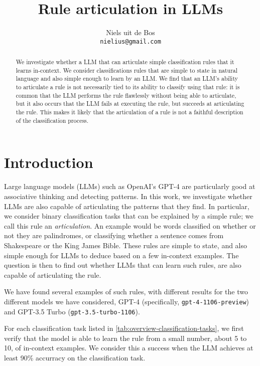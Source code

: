 \documentclass{article}
\title{Rule articulation in LLMs}
\author{%
  Niels uit de Bos \\
  \texttt{nielius@gmail.com} \\
}
\newcommand{\gptf}{GPT-4}
\newcommand{\gptt}{GPT-3.5 Turbo}
\begin{document}
\maketitle


\begin{abstract}
  We investigate whether a LLM that can articulate simple classification rules
  that it learns in-context.
  We consider classifications rules that are simple to state in natural language
  and also simple enough to learn by an LLM.
  We find that an LLM's ability to articulate a rule is not necessarily tied
  to its ability to classify using that rule:
  it is common that the LLM performs the rule flawlessly without being able to articulate,
  but it also occurs that the LLM fails at executing the rule, but succeeds
  at articulating the rule.
  This makes it likely that the articulation of a rule is not a faithful description
  of the classification process.
\end{abstract}


\section{Introduction}

Large language models (LLMs) such as OpenAI's GPT-4 are particularly good at associative thinking
and detecting patterns.
In this work, we investigate whether LLMs are also capable of articulating
the patterns that they find.
In particular, we consider binary classification tasks that 
can be explained by a simple rule; we call this rule an \emph{articulation}.
An example would be words classified on whether or not they are palindromes,
or classifying whether a sentence comes from Shakespeare or the King James Bible.
These rules are simple to state, and also simple enough for LLMs to deduce
based on a few in-context examples.
The question is then to find out whether LLMs that can learn such rules,
are also capable of articulating the rule.


We have found several examples of such rules,
with different results for the two different models we have considered,
\gptf{} (specifically, \texttt{gpt-4-1106-preview})
and \gptt{} (\texttt{gpt-3.5-turbo-1106}).

For each classification task listed in \cref{tab:overview-classification-tasks},
we first verify that the model is able to learn the rule from a small number,
about 5 to 10, of in-context examples.
We consider this a success when the LLM achieves at least 90\% accurracy on the classification task.
\end{document}
